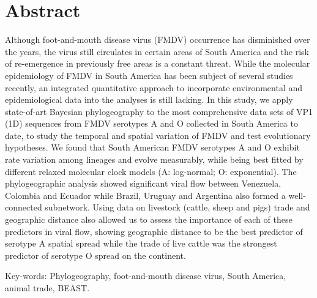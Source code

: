 \documentclass[10pt]{article}
\begin{document}
\section*{Abstract}
Although foot-and-mouth disease virus (FMDV) occurrence has disminished over the years, the virus still circulates in certain areas of South America and the risk of re-emergence in previously free areas is a constant threat.
While the molecular epidemiology of FMDV in South America has been subject of several studies recently, an integrated quantitative approach to incorporate environmental and epidemiological data into the analyses is still lacking.
In this study, we apply state-of-art Bayesian phylogeography to the most comprehensive data sets of VP1 (1D) sequences from FMDV serotypes A and O collected in South America to date, to study the temporal and spatial variation of FMDV and test evolutionary hypotheses.
We found that South American FMDV serotypes A and O exhibit rate variation among lineages and evolve measurably, while being best fitted by different relaxed molecular clock models (A: log-normal; O: exponential).
The phylogeographic analysis showed significant viral flow between Venezuela, Colombia and Ecuador while Brazil, Uruguay and Argentina also formed a well-connected subnetwork.
Using data on livestock (cattle, sheep and pigs) trade and geographic distance also allowed us to assess the importance of each of these predictors in viral flow, showing geographic distance to be the best predictor of serotype A spatial spread while the trade of live cattle was the strongest predictor of serotype O spread on the continent.

Key-words: Phylogeography, foot-and-mouth disease virus, South America, animal trade, BEAST.
\end{document}
